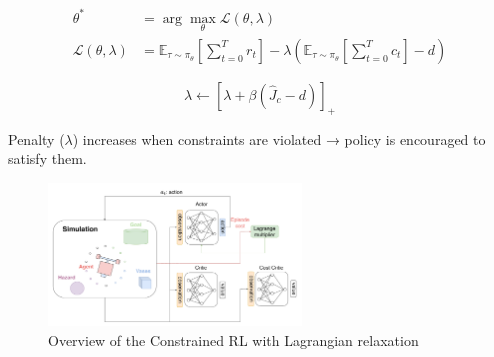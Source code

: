 \documentclass[8pt, aspectratio=169]{beamer} %
\begin{document}
\begin{frame}{\insertsubsectionhead}

  \begin{equation}
    \begin{aligned}
      \theta^* &= \arg\max_\theta \mathcal{L}(\theta, \lambda) \\
      \mathcal{L}(\theta, \lambda) &= \mathbb{E}_{\tau \sim \pi_\theta} \left[ \sum^T_{t = 0} r_t \right] - \lambda \left( \mathbb{E}_{\tau \sim \pi_\theta} \left[ \sum^T_{t = 0} c_t \right] - d \right)
    \end{aligned}
  \end{equation}

  \vspace{0.5cm}

  \begin{equation} \label{eq:lagrange-multiplier-update}
    \lambda \leftarrow \left[ \lambda + \beta\left( \hat{J}_c - d \right) \right]_+
  \end{equation}

  \vspace{0.5cm}

  Penalty ($\lambda$) increases when constraints are violated → policy is encouraged to satisfy them.


\end{frame}


\begin{frame}{\insertsubsectionhead}
  \begin{figure}
    \includegraphics[width=0.6\textwidth]{figures/ppo-lag.pdf}
    \caption{Overview of the Constrained RL with Lagrangian relaxation}
  \end{figure}
\end{frame}
\end{document}
